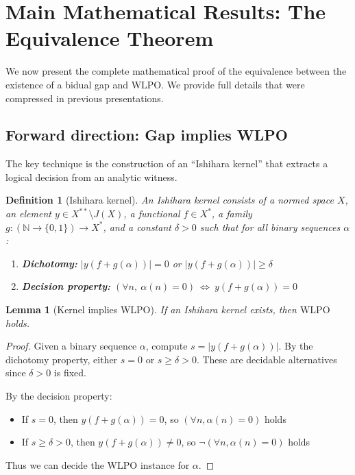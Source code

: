 \documentclass[11pt]{article}  %
\newtheorem{lemma}[theorem]{Lemma}
\newtheorem{definition}[theorem]{Definition}
\newenvironment{lem}{\begin{lemma}}{\end{lemma}}
\newenvironment{defi}{\begin{definition}}{\end{definition}}
\newcommand{\N}{\mathbb{N}}
\newcommand{\WLPO}{\mathrm{WLPO}}
\begin{document}
\section{Main Mathematical Results: The Equivalence Theorem}

We now present the complete mathematical proof of the equivalence between the existence of a bidual gap and $\WLPO$. We provide full details that were compressed in previous presentations.

\subsection{Forward direction: Gap implies WLPO}

The key technique is the construction of an ``Ishihara kernel'' that extracts a logical decision from an analytic witness.

\begin{defi}[Ishihara kernel]
An Ishihara kernel consists of a normed space $X$, an element $y\in X^{**}\setminus J(X)$, a functional $f\in X^*$, a family $g:(\N\to\{0,1\})\to X^*$, and a constant $\delta>0$ such that for all binary sequences $\alpha$:
\begin{enumerate}
\item \textbf{Dichotomy:} $|y(f+g(\alpha))|=0$ or $|y(f+g(\alpha))|\ge \delta$
\item \textbf{Decision property:} $(\forall n,\ \alpha(n)=0)\ \Leftrightarrow\ y(f+g(\alpha))=0$
\end{enumerate}
\end{defi}

\begin{lem}[Kernel implies WLPO]\label{lem:kernel-wlpo}
If an Ishihara kernel exists, then $\WLPO$ holds.
\end{lem}

\begin{proof}
Given a binary sequence $\alpha$, compute $s=|y(f+g(\alpha))|$. By the dichotomy property, either $s=0$ or $s\ge \delta>0$. These are decidable alternatives since $\delta>0$ is fixed.

By the decision property:
\begin{itemize}
\item If $s=0$, then $y(f+g(\alpha))=0$, so $(\forall n,\alpha(n)=0)$ holds
\item If $s\ge\delta>0$, then $y(f+g(\alpha))\ne 0$, so $\neg(\forall n,\alpha(n)=0)$ holds
\end{itemize}
Thus we can decide the $\WLPO$ instance for $\alpha$.
\end{proof}
\end{document}
